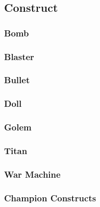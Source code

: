 \subsection{Construct}
\begin{multicols}{2}
    \subsubsection*{Bomb}\label{foe:bomb}
    \subsubsection*{Blaster}\label{foe:blaster}
    \subsubsection*{Bullet}\label{foe:bullet}
    \subsubsection*{Doll}\label{foe:doll}
    \subsubsection*{Golem}\label{foe:golem}
    \subsubsection*{Titan}\label{foe:titan}
    \subsubsection*{War Machine}\label{foe:war-machine}
\end{multicols}
\subsubsection{Champion Constructs}

